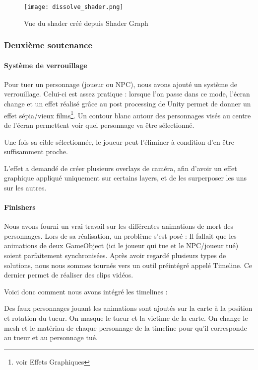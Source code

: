             \begin{figure}[hbt!]
                \centering
                \texttt{[image: dissolve\_shader.png]}
                \caption{Vue du shader créé depuis Shader Graph}
            \end{figure}
			\FloatBarrier


	\vspace{0.5cm}
	\subsubsection{Deuxième soutenance}
	\vspace{0.5cm}

		\paragraph{Système de verrouillage}

			Pour tuer un personnage (joueur ou NPC),
			nous avons ajouté un système de verrouillage. Celui-ci est assez pratique : lorsque l'on passe dans ce mode, l'écran change et 
			un effet réalisé grâce au post processing de Unity permet de donner un effet sépia/vieux films\footnote{voir Effets Graphiques}.
			Un contour blanc autour des personnages visés au centre de l'écran permettent voir quel personnage va être sélectionné.

			Une fois sa cible sélectionnée, le joueur peut l'éliminer à condition d'en être suffisamment proche.

			L'effet a demandé de créer plusieurs overlays de caméra, afin d'avoir un effet graphique
			appliqué uniquement sur certains layers, et de les surperposer les uns sur les autres. 

		\paragraph{Finishers}
			Nous avons fourni un vrai travail sur les différentes animations de mort des personnages.
			Lors de sa réalisation, un problème s'est posé : Il fallait que les animations de deux GameObject (ici le joueur qui tue et le NPC/joueur tué) 
			soient parfaitement synchronisées. Après avoir regardé plusieurs types de solutions, nous nous sommes tournés vers un outil préintégré appelé Timeline.
			Ce dernier permet de réaliser des clips vidéos.

			Voici donc comment nous avons intégré les timelines :
			
			Des faux personnages jouant les animations sont ajoutés sur la carte à la position et rotation du tueur.
			On masque le tueur et la victime de la carte.
			On change le mesh et le matériau de chaque personnage de la timeline pour qu'il corresponde au tueur et au
			personnage tué.

